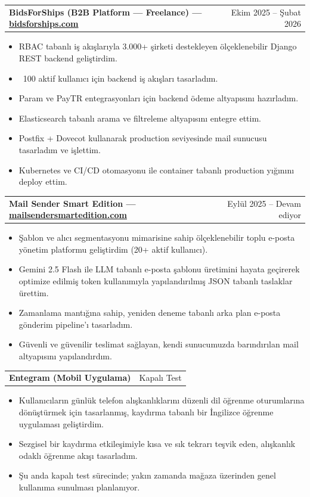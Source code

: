 \documentclass[10pt,a4paper]{extarticle}
\makeatletter
\newcommand{\entry}[2]{%
\noindent\begin{tabular*}{\textwidth}{@{\extracolsep{\fill}}lr}
\textbf{#1} & #2\\
\end{tabular*}
}
\makeatother
\begin{document}
\entry{BidsForShips (B2B Platform — Freelance) \textnormal{---} \href{https://bidsforships.com}{bidsforships.com}}{Ekim 2025 -- Şubat 2026}
\begin{itemize}[leftmargin=*,noitemsep,topsep=0pt]
\item RBAC tabanlı iş akışlarıyla 3.000+ şirketi destekleyen ölçeklenebilir Django REST backend geliştirdim.
\item ~100 aktif kullanıcı için backend iş akışları tasarladım.
\item Param ve PayTR entegrasyonları için backend ödeme altyapısını hazırladım.
\item Elasticsearch tabanlı arama ve filtreleme altyapısını entegre ettim.
\item Postfix + Dovecot kullanarak production seviyesinde mail sunucusu tasarladım ve işlettim.
\item Kubernetes ve CI/CD otomasyonu ile container tabanlı production yığınını deploy ettim.
\end{itemize}

\entry{Mail Sender Smart Edition \textnormal{---} \href{https://mailsendersmartedition.com}{mailsendersmartedition.com}}{Eylül 2025 -- Devam ediyor}
\begin{itemize}[leftmargin=*,noitemsep,topsep=0pt]
\item Şablon ve alıcı segmentasyonu mimarisine sahip ölçeklenebilir toplu e-posta yönetim platformu geliştirdim (20+ aktif kullanıcı).
\item Gemini 2.5 Flash ile LLM tabanlı e-posta şablonu üretimini hayata geçirerek optimize edilmiş token kullanımıyla yapılandırılmış JSON tabanlı taslaklar ürettim.
\item Zamanlama mantığına sahip, yeniden deneme tabanlı arka plan e-posta gönderim pipeline'ı tasarladım.
\item Güvenli ve güvenilir teslimat sağlayan, kendi sunucumuzda barındırılan mail altyapısını yapılandırdım.
\end{itemize}

\entry{Entegram (Mobil Uygulama)}{Kapalı Test}
\begin{itemize}[leftmargin=*,noitemsep,topsep=0pt]
\item Kullanıcıların günlük telefon alışkanlıklarını düzenli dil öğrenme oturumlarına dönüştürmek için tasarlanmış, kaydırma tabanlı bir İngilizce öğrenme uygulaması geliştirdim.
\item Sezgisel bir kaydırma etkileşimiyle kısa ve sık tekrarı teşvik eden, alışkanlık odaklı öğrenme akışı tasarladım.
\item Şu anda kapalı test sürecinde; yakın zamanda mağaza üzerinden genel kullanıma sunulması planlanıyor.
\end{itemize}
\end{document}
